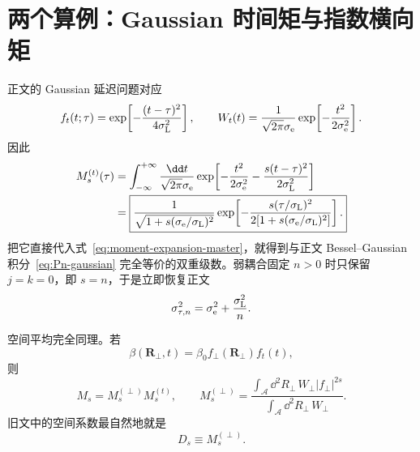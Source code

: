 \section{两个算例：Gaussian 时间矩与指数横向矩}

正文的 Gaussian 延迟问题对应
\begin{equation}
f_t(t;\tau)
=\exp\!\left[-\frac{(t-\tau)^2}{4\sigma_{\rm L}^2}\right],
\qquad
W_t(t)=\frac{1}{\sqrt{2\pi}\sigma_{\rm e}}
\exp\!\left[-\frac{t^2}{2\sigma_{\rm e}^2}\right].
\end{equation}
因此
\begin{align}
M_s^{(t)}(\tau)
&=\int_{-\infty}^{+\infty}
\frac{\dd t}{\sqrt{2\pi}\sigma_{\rm e}}
\exp\!\left[-\frac{t^2}{2\sigma_{\rm e}^2}
-\frac{s(t-\tau)^2}{2\sigma_{\rm L}^2}\right]\\
&=\boxed{
\frac{1}{\sqrt{1+s(\sigma_{\rm e}/\sigma_{\rm L})^2}}
\exp\!\left[
-\frac{s(\tau/\sigma_{\rm L})^2}
{2[1+s(\sigma_{\rm e}/\sigma_{\rm L})^2]}
\right].}
\label{eq:gaussian-time-moment}
\end{align}
把它直接代入式~\eqref{eq:moment-expansion-master}，就得到与正文 Bessel--Gaussian 积分~\eqref{eq:Pn-gaussian} 完全等价的双重级数。弱耦合固定 \(n>0\) 时只保留 \(j=k=0\)，即 \(s=n\)，于是立即恢复正文
\begin{equation}
\sigma_{\tau,n}^2
=\sigma_{\rm e}^2+\frac{\sigma_{\rm L}^2}{n}.
\end{equation}

空间平均完全同理。若
\begin{equation}
\beta(\bm R_\perp,t)
=\beta_0f_\perp(\bm R_\perp)f_t(t),
\end{equation}
则
\begin{equation}
M_s=M_s^{(\perp)}M_s^{(t)},
\qquad
M_s^{(\perp)}
=\frac{\displaystyle\int_{\mathcal A}\dd^2R_\perp\,
W_\perp|f_\perp|^{2s}}
{\displaystyle\int_{\mathcal A}\dd^2R_\perp\,W_\perp}.
\label{eq:general-spatial-moment}
\end{equation}
旧文中的空间系数最自然地就是
\begin{equation}
\boxed{D_s\equiv M_s^{(\perp)}.}
\label{eq:Dfactor_start}
\end{equation}


